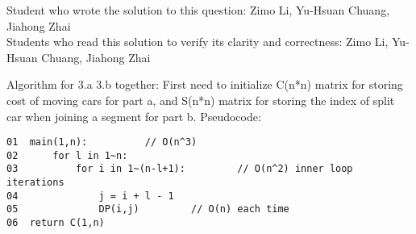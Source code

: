 \documentclass{article}
\begin{document}
\noindent Student who wrote the solution to this question: Zimo Li, Yu-Hsuan Chuang, Jiahong Zhai\\
Students who read this solution to verify its clarity and correctness: Zimo Li, Yu-Hsuan Chuang, Jiahong Zhai\\

\begin{enumerate}
Algorithm for 3.a 3.b together:\newline
First need to initialize C(n*n) matrix for storing cost of moving cars for part a, and S(n*n) matrix for storing the index of split car when joining a segment for part b. \newline
\newline
Pseudocode:
\begin{verbatim}
01  main(1,n):			// O(n^3)
02      for l in 1~n:
03          for i in 1~(n-l+1):         // O(n^2) inner loop iterations
04              j = i + l - 1
05              DP(i,j)         // O(n) each time
06  return C(1,n)


\end{verbatim}
\end{enumerate}
\end{document}
